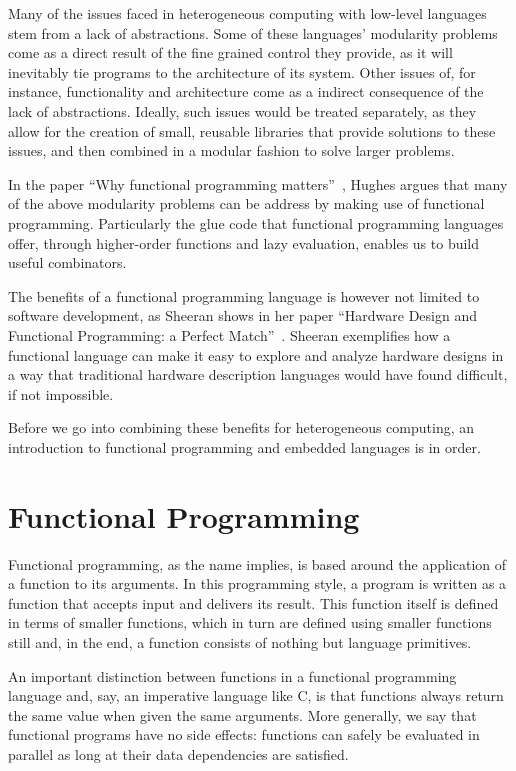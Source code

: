 \documentclass[../paper.tex]{subfiles}
\begin{document}
Many of the issues faced in heterogeneous computing with low-level languages stem from a lack of abstractions. Some of these languages' modularity problems come as a direct result of the fine grained control they provide, as it will inevitably tie programs to the architecture of its system. Other issues of, for instance, functionality and architecture come as a indirect consequence of the lack of abstractions. Ideally, such issues would be treated separately, as they allow for the creation of small, reusable libraries that provide solutions to these issues, and then combined in a modular fashion to solve larger problems.

In the paper ``Why functional programming matters''~\cite{hughes1989}, Hughes argues that many of the above modularity problems can be address by making use of functional programming. Particularly the glue code that functional programming languages offer, through higher-order functions and lazy evaluation, enables us to build useful combinators.

The benefits of a functional programming language is however not limited to software development, as Sheeran shows in her paper ``Hardware Design and Functional Programming: a Perfect Match''~\cite{sheeran2005}. Sheeran exemplifies how a functional language can make it easy to explore and analyze hardware designs in a way that traditional hardware description languages would have found difficult, if not impossible.

Before we go into combining these benefits for heterogeneous computing, an introduction to functional programming and embedded languages is in order.

\section{Functional Programming}
\label{functional}

Functional programming, as the name implies, is based around the application of a function to its arguments. In this programming style, a program is written as a function that accepts input and delivers its result. This function itself is defined in terms of smaller functions, which in turn are defined using smaller functions still and, in the end, a function consists of nothing but language primitives.

An important distinction between functions in a functional programming language and, say, an imperative language like C, is that functions always return the same value when given the same arguments. More generally, we say that functional programs have no side effects: functions can safely be evaluated in parallel as long at their data dependencies are satisfied.
\end{document}
